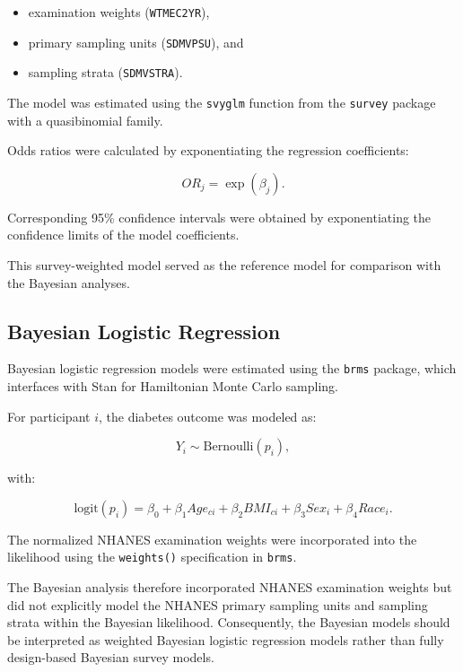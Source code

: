 \documentclass[12pt]{article}
\begin{document}
\begin{itemize}
    \item examination weights (\texttt{WTMEC2YR}),
    \item primary sampling units (\texttt{SDMVPSU}), and
    \item sampling strata (\texttt{SDMVSTRA}).
\end{itemize}

The model was estimated using the \texttt{svyglm} function from the \texttt{survey} package with a quasibinomial family.

Odds ratios were calculated by exponentiating the regression coefficients:

\[
OR_j = \exp(\beta_j).
\]

Corresponding 95\% confidence intervals were obtained by exponentiating the confidence limits of the model coefficients.

This survey-weighted model served as the reference model for comparison with the Bayesian analyses.


\subsection{Bayesian Logistic Regression}

Bayesian logistic regression models were estimated using the \texttt{brms} package, which interfaces with Stan for Hamiltonian Monte Carlo sampling.

For participant \(i\), the diabetes outcome was modeled as:

\[
Y_i \sim \text{Bernoulli}(p_i),
\]

with:

\[
\text{logit}(p_i)
=
\beta_0+
\beta_1Age_{ci}+
\beta_2BMI_{ci}+
\beta_3Sex_i+
\beta_4Race_i.
\]

The normalized NHANES examination weights were incorporated into the likelihood using the \texttt{weights()} specification in \texttt{brms}.

The Bayesian analysis therefore incorporated NHANES examination weights but did not explicitly model the NHANES primary sampling units and sampling strata within the Bayesian likelihood. Consequently, the Bayesian models should be interpreted as weighted Bayesian logistic regression models rather than fully design-based Bayesian survey models.
\end{document}
